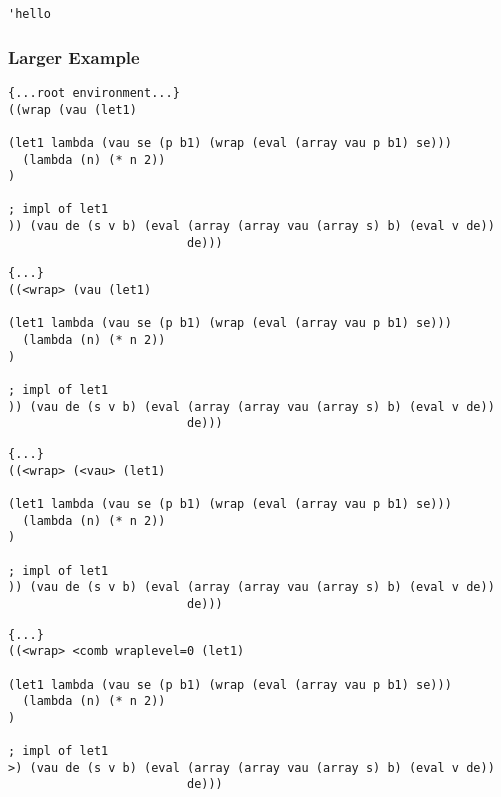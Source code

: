 \documentclass{beamer}
\begin{document}
\begin{frame}[fragile]
\footnotesize
\begin{verbatim}
'hello
\end{verbatim}
\end{frame}

\begin{frame}[fragile]
\frametitle{Larger Example}
\footnotesize
\begin{verbatim}
{...root environment...}
((wrap (vau (let1)

(let1 lambda (vau se (p b1) (wrap (eval (array vau p b1) se)))
  (lambda (n) (* n 2))
)

; impl of let1
)) (vau de (s v b) (eval (array (array vau (array s) b) (eval v de))
                         de)))
\end{verbatim}
\end{frame}

\begin{frame}[fragile]
\footnotesize
\begin{verbatim}
{...}
((<wrap> (vau (let1)

(let1 lambda (vau se (p b1) (wrap (eval (array vau p b1) se)))
  (lambda (n) (* n 2))
)

; impl of let1
)) (vau de (s v b) (eval (array (array vau (array s) b) (eval v de))
                         de)))
\end{verbatim}
\end{frame}

\begin{frame}[fragile]
\footnotesize
\begin{verbatim}
{...}
((<wrap> (<vau> (let1)

(let1 lambda (vau se (p b1) (wrap (eval (array vau p b1) se)))
  (lambda (n) (* n 2))
)

; impl of let1
)) (vau de (s v b) (eval (array (array vau (array s) b) (eval v de))
                         de)))
\end{verbatim}
\end{frame}

\begin{frame}[fragile]
\footnotesize
\begin{verbatim}
{...}
((<wrap> <comb wraplevel=0 (let1)

(let1 lambda (vau se (p b1) (wrap (eval (array vau p b1) se)))
  (lambda (n) (* n 2))
)

; impl of let1
>) (vau de (s v b) (eval (array (array vau (array s) b) (eval v de))
                         de)))
\end{verbatim}
\end{frame}
\end{document}
